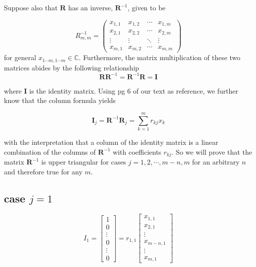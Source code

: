 \documentclass[a4paper,12pt]{article}
\begin{document}
Suppose also that $\textbf{R}$ has an inverse,  $\textbf{R}^{-1}$, given to be

\begin{equation*}
R_{m,m}^{-1} = 
\begin{pmatrix}
x_{1,1} & x_{1,2} & \cdots & x_{1,m} \\
x_{2,1} & x_{2,2} & \cdots & x_{2,m} \\
\vdots  & \vdots  & \ddots & \vdots  \\
x_{m,1} & x_{m,2} & \cdots & x_{m,m} 
\end{pmatrix}
\end{equation*}
for general $x_{1\cdots m, 1 \cdots m} \in \mathbb{C}$. Furthermore, the matrix multiplication of these two matrices abides by the following relationship 
\begin{equation}
\textbf{R} \textbf{R}^{-1} =  \textbf{R}^{-1}\textbf{R}= \textbf{I} 
\end{equation}

where $\textbf{I}$ is the identity matrix. Using pg 6 of our text as reference, we further know that the column formula yields

\begin{equation}
\textbf{I}_j  = \textbf{R}^{-1} \textbf{R}_j = \sum_{k=1}^m r_{kj} x_k 
\end{equation}

with the interpretation that a column of the identity matrix is a linear combination of the columns of $\textbf{R}^{-1}$ with coefficients $r_{kj}$. So we will prove that the matrix  $\textbf{R}^{-1}$ is upper triangular for cases $j=1,2,\cdots,m-n, m$ for an arbitrary $n$ and therefore true for any $m$. 

\subsection{case $j=1$ }

\begin{equation}
I_1 =\begin{bmatrix}
           1 \\
           0 \\
           \vdots \\
           0 \\
           \vdots \\
           0
         \end{bmatrix} = r_{1,1} \begin{bmatrix}
           x_{1,1} \\
           x_{2,1} \\
           \vdots \\
           x_{m-n,1} \\
           \vdots \\
           x_{m,1}
         \end{bmatrix}
\end{equation}
\end{document}
